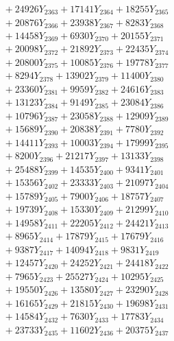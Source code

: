 \documentclass[a4paper,10pt]{article}
\begin{document}
{\begin{align}
&\;  + 24926 Y_{2363} + 17141 Y_{2364} + 18255 Y_{2365} \\[0.3ex]
&\;  + 20876 Y_{2366} + 23938 Y_{2367} + 8283 Y_{2368} \\[0.5ex]\allowbreak
&\;  + 14458 Y_{2369} + 6930 Y_{2370} + 20155 Y_{2371} \\[0.3ex]
&\;  + 20098 Y_{2372} + 21892 Y_{2373} + 22435 Y_{2374} \\[0.3ex]
&\;  + 20800 Y_{2375} + 10085 Y_{2376} + 19778 Y_{2377} \\[0.3ex]
&\;  + 8294 Y_{2378} + 13902 Y_{2379} + 11400 Y_{2380} \\[0.3ex]
&\;  + 23360 Y_{2381} + 9959 Y_{2382} + 24616 Y_{2383} \\[0.3ex]
&\;  + 13123 Y_{2384} + 9149 Y_{2385} + 23084 Y_{2386} \\[0.3ex]
&\;  + 10796 Y_{2387} + 23058 Y_{2388} + 12909 Y_{2389} \\[0.3ex]
&\;  + 15689 Y_{2390} + 20838 Y_{2391} + 7780 Y_{2392} \\[0.3ex]
&\;  + 14411 Y_{2393} + 10003 Y_{2394} + 17999 Y_{2395} \\[0.3ex]
&\;  + 8200 Y_{2396} + 21217 Y_{2397} + 13133 Y_{2398} \\[0.5ex]\allowbreak
&\;  + 25488 Y_{2399} + 14535 Y_{2400} + 9341 Y_{2401} \\[0.3ex]
&\;  + 15356 Y_{2402} + 23333 Y_{2403} + 21097 Y_{2404} \\[0.3ex]
&\;  + 15789 Y_{2405} + 7900 Y_{2406} + 18757 Y_{2407} \\[0.3ex]
&\;  + 19739 Y_{2408} + 15330 Y_{2409} + 21299 Y_{2410} \\[0.3ex]
&\;  + 14958 Y_{2411} + 22205 Y_{2412} + 24421 Y_{2413} \\[0.3ex]
&\;  + 8965 Y_{2414} + 17879 Y_{2415} + 17679 Y_{2416} \\[0.3ex]
&\;  + 9387 Y_{2417} + 14094 Y_{2418} + 9831 Y_{2419} \\[0.3ex]
&\;  + 12457 Y_{2420} + 24252 Y_{2421} + 24418 Y_{2422} \\[0.3ex]
&\;  + 7965 Y_{2423} + 25527 Y_{2424} + 10295 Y_{2425} \\[0.3ex]
&\;  + 19550 Y_{2426} + 13580 Y_{2427} + 23290 Y_{2428} \\[0.5ex]\allowbreak
&\;  + 16165 Y_{2429} + 21815 Y_{2430} + 19698 Y_{2431} \\[0.3ex]
&\;  + 14584 Y_{2432} + 7630 Y_{2433} + 17783 Y_{2434} \\[0.3ex]
&\;  + 23733 Y_{2435} + 11602 Y_{2436} + 20375 Y_{2437} \\[0.3ex]

\end{align}}
\end{document}
